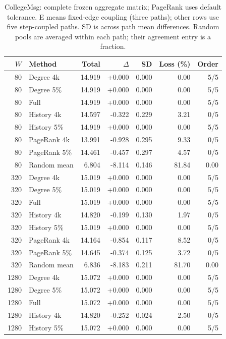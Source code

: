 \begin{table}[htbp]
\caption{CollegeMsg: complete frozen aggregate matrix; PageRank uses default tolerance. E means fixed-edge coupling (three paths); other rows use five step-coupled paths. SD is across path mean differences. Random pools are averaged within each path; their agreement entry is a fraction.}\label{tab:s-college_msg}
\begin{tabular}{rlrrrrr}
\toprule
$W$ & Method & Total & $\Delta$ & SD & Loss (\%) & Order \\
\midrule
80 & Degree 4k & 14.919 & +0.000 & 0.000 & 0.00 & 5/5 \\
80 & Degree 5\% & 14.919 & +0.000 & 0.000 & 0.00 & 5/5 \\
80 & Full & 14.919 & +0.000 & 0.000 & 0.00 & 5/5 \\
80 & History 4k & 14.597 & -0.322 & 0.229 & 3.21 & 0/5 \\
80 & History 5\% & 14.919 & +0.000 & 0.000 & 0.00 & 5/5 \\
80 & PageRank 4k & 13.991 & -0.928 & 0.295 & 9.33 & 0/5 \\
80 & PageRank 5\% & 14.461 & -0.457 & 0.297 & 4.57 & 0/5 \\
80 & Random mean & 6.804 & -8.114 & 0.146 & 81.84 & 0.00 \\
320 & Degree 4k & 15.019 & +0.000 & 0.000 & 0.00 & 5/5 \\
320 & Degree 5\% & 15.019 & +0.000 & 0.000 & 0.00 & 5/5 \\
320 & Full & 15.019 & +0.000 & 0.000 & 0.00 & 5/5 \\
320 & History 4k & 14.820 & -0.199 & 0.130 & 1.97 & 0/5 \\
320 & History 5\% & 15.019 & +0.000 & 0.000 & 0.00 & 5/5 \\
320 & PageRank 4k & 14.164 & -0.854 & 0.117 & 8.52 & 0/5 \\
320 & PageRank 5\% & 14.645 & -0.374 & 0.125 & 3.72 & 0/5 \\
320 & Random mean & 6.836 & -8.183 & 0.211 & 81.70 & 0.00 \\
1280 & Degree 4k & 15.072 & +0.000 & 0.000 & 0.00 & 5/5 \\
1280 & Degree 5\% & 15.072 & +0.000 & 0.000 & 0.00 & 5/5 \\
1280 & Full & 15.072 & +0.000 & 0.000 & 0.00 & 5/5 \\
1280 & History 4k & 14.820 & -0.252 & 0.024 & 2.50 & 0/5 \\
1280 & History 5\% & 15.072 & +0.000 & 0.000 & 0.00 & 5/5 \\

\end{tabular}
\end{table}
